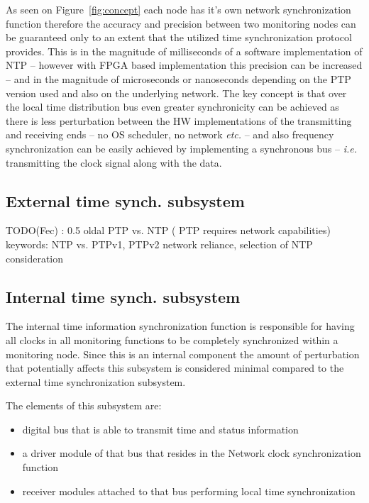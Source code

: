 \documentclass[article]{IEEEtran}
\begin{document}
As seen on Figure~\ref{fig:concept} each node has it's own network synchronization function therefore the accuracy and
precision between two monitoring nodes can be guaranteed only to an extent that the utilized time synchronization
protocol provides. This is in the magnitude of milliseconds of a software implementation of NTP -- however with FPGA based implementation
this precision can be increased --  and in the magnitude of
microseconds or nanoseconds depending on the PTP version used and also on the underlying network.
The key concept is that over the local time distribution bus even greater synchronicity can be achieved as there is less
perturbation between the HW implementations of the transmitting and receiving ends -- no OS scheduler, no network \emph{etc.} --
and also frequency synchronization can be easily achieved by implementing a synchronous bus -- \emph{i.e.} transmitting the
clock signal along with the data.

\subsection{External time synch. subsystem}
TODO(Fec) : 0.5 oldal PTP vs. NTP ( PTP requires network capabilities)
keywords: NTP vs. PTPv1, PTPv2 network reliance, selection of NTP consideration

\subsection{Internal time synch. subsystem}

The internal time information synchronization function is responsible for having all clocks in all monitoring functions
to be completely synchronized within a monitoring node. Since this is an internal component the amount of perturbation 
that potentially affects this subsystem is considered minimal compared to the external time synchronization subsystem.

The elements of this subsystem are:
\begin{itemize}
    \item digital bus that is able to transmit time and status information
    \item a driver module of that bus that resides in the Network clock synchronization function
    \item receiver modules attached to that bus performing local time synchronization
\end{itemize}
\end{document}
